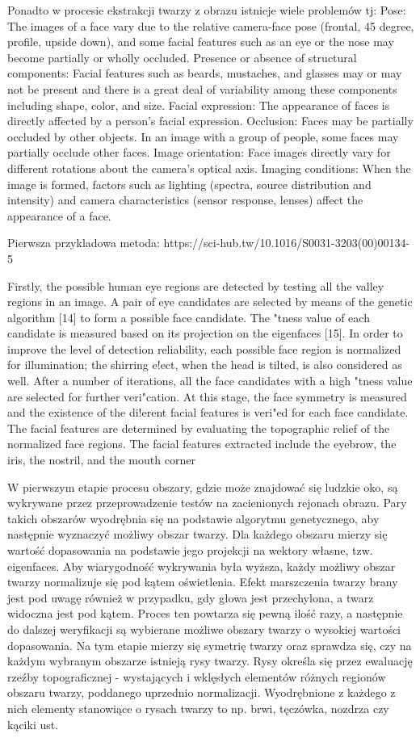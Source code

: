 Ponadto w procesie ekstrakcji twarzy z obrazu istnieje wiele problemów tj:
Pose: The images of a face vary due to the relative camera-face pose (frontal, 45
degree, profile, upside down), and some facial features such as an eye or the nose
may become partially or wholly occluded.
Presence or absence of structural components: Facial features such as beards,
mustaches, and glasses may or may not be present and there is a great deal of
variability among these components including shape, color, and size.
Facial expression: The appearance of faces is directly affected by a person’s facial
expression.
Occlusion: Faces may be partially occluded by other objects. In an image with a
group of people, some faces may partially occlude other faces.
Image orientation: Face images directly vary for different rotations about the
camera’s optical axis.
Imaging conditions: When the image is formed, factors such as lighting (spectra,
source distribution and intensity) and camera characteristics (sensor response,
lenses) affect the appearance of a face.

Pierwsza przykladowa metoda:
https://sci-hub.tw/10.1016/S0031-3203(00)00134-5

Firstly, the possible human eye regions are detected by
testing all the valley regions in an image. A pair of eye
candidates are selected by means of the genetic algorithm
[14] to form a possible face candidate. The "tness value
of each candidate is measured based on its projection on
the eigenfaces [15]. In order to improve the level of
detection reliability, each possible face region is normalized for illumination; the shirring e!ect, when the
head is tilted, is also considered as well. After a number of
iterations, all the face candidates with a high "tness value
are selected for further veri"cation. At this stage, the face
symmetry is measured and the existence of the di!erent
facial features is veri"ed for each face candidate. The
facial features are determined by evaluating the topographic relief of the normalized face regions. The facial
features extracted include the eyebrow, the iris, the
nostril, and the mouth corner

W pierwszym etapie procesu obszary, gdzie może znajdować się ludzkie oko, są wykrywane przez przeprowadzenie testów na zacienionych rejonach obrazu. Pary takich obszarów wyodrębnia się na podstawie algorytmu genetycznego, aby następnie wyznaczyć możliwy obszar twarzy. Dla każdego obszaru mierzy się wartość dopasowania na podstawie jego projekcji na wektory własne, tzw. eigenfaces. Aby wiarygodność wykrywania była wyższa, każdy możliwy obszar twarzy normalizuje się pod kątem oświetlenia. Efekt marszczenia twarzy brany jest pod uwagę również w przypadku, gdy głowa jest przechylona, a twarz widoczna jest pod kątem. Proces ten powtarza się pewną ilość razy, a następnie do dalszej weryfikacji są wybierane możliwe obszary twarzy o wysokiej wartości dopasowania. Na tym etapie mierzy się symetrię twarzy oraz sprawdza się, czy na każdym wybranym obszarze istnieją rysy twarzy. Rysy określa się przez ewaluację rzeźby topograficznej - wystających i wklęsłych elementów różnych regionów obszaru twarzy, poddanego uprzednio normalizacji. Wyodrębnione z każdego z nich elementy stanowiące o rysach twarzy to np. brwi, tęczówka, nozdrza czy kąciki ust.

